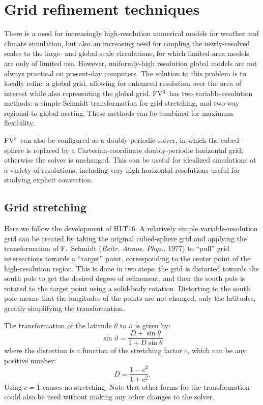 \documentclass[12pt,letterpaper]{book}
\newcommand{\fv}{FV$^{\mathrm{3}}$}
\begin{document}
\chapter{Grid refinement techniques}

There is a need for increasingly high-resolution numerical models for weather and climate simulation, but also an increasing need for coupling the newly-resolved scales to the large- and global-scale circulations, for which limited-area models are only of limited use. However, uniformly-high resolution global models are not always practical on present-day computers. The solution to this problem is to locally refine a global grid, allowing for enhanced resolution over the area of interest while also representing the global grid. \fv\ has two variable-resolution methods: a simple Schmidt transformation for grid stretching, and two-way regional-to-global nesting. These methods can be combined for maximum flexibility. 

\fv\ can also be configured as a doubly-periodic solver, in which the cubed-sphere is replaced by a Cartesian-coordinate doubly-periodic horizontal grid; otherwise the solver is unchanged. This can be useful for idealized simulations at a variety of resolutions, including very high horizontal resolutions useful for studying explicit convection. 

\section{Grid stretching}

Here we follow the development of HLT16. A relatively simple variable-resolution grid can be created by taking the original cubed-sphere grid and applying the transformation of F.~Schmidt (\textit{Beitr. Atmos. Phys.}, 1977) to ``pull'' grid intersections towards a ``target'' point, corresponding to the center point of the high-resolution region. This is done in two steps: the grid is distorted towards the south pole to get the desired degree of refinement, and then the south pole is rotated to the target point using a solid-body rotation. Distorting to the south pole means that the longitudes of the points are not changed, only the latitudes, greatly simplifying the transformation.

The transformation of the latitude $\theta$ to $\vartheta$ is given by:
\begin{equation}
\sin \vartheta = \frac{D + \sin \theta}{1 + D\sin \theta}
\end{equation}
where the distortion is a function of the stretching factor $c$, which can be any positive number:
\begin{equation}
D = \frac{1-c^2}{1+c^2}.
\end{equation}
Using $c = 1$ causes no stretching. Note that other forms for the transformation could also be used without making any other changes to the solver.
\end{document}
